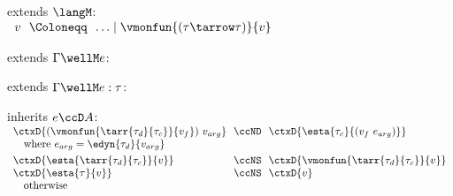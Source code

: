 \begin{flushleft}

 extends $\langM$:\\
$\begin{array}{l@{~~}c@{~~}l}
  v & \Coloneqq & \ldots \mid \vmonfun{(\tau\tarrow\tau)}{v}
\end{array}$

\medskip
\begin{minipage}[t]{\columnwidth}
 extends $\Gamma \wellM e$:
\begin{mathpar}
\end{mathpar}
\end{minipage}%
\begin{minipage}[t]{\columnwidth}
 extends $\Gamma \wellM e : \tau$:
\begin{mathpar}
\end{mathpar}
\end{minipage}

\medskip
\begin{minipage}[t]{\columnwidth}
 inherits $e \ccD A$:\\
$\begin{array}{l@{~~}c@{~~}l}
  \ctxD{(\vmonfun{\tarr{\tau_d}{\tau_c}}{v_f})~v_{arg}} & \ccND & \ctxD{\esta{\tau_c}{(v_f~e_{arg})}}
\\ \multicolumn{3}{l}{\mbox{\quad where $e_{arg} = \edyn{\tau_d}{v_{arg}}$}}
\\[0.8ex]
  \ctxD{\esta{\tarr{\tau_d}{\tau_c}}{v}} & \ccNS & \ctxD{\vmonfun{\tarr{\tau_d}{\tau_c}}{v}}
\\
  \ctxD{\esta{\tau}{v}} & \ccNS & \ctxD{v}
\\ \multicolumn{3}{l}{\mbox{\quad otherwise}}
\end{array}$

\vspace{7em}


\end{minipage}
\end{flushleft}
